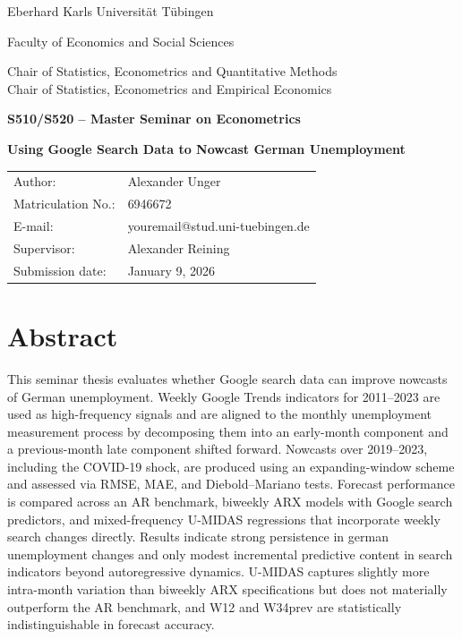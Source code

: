 \documentclass[12pt,a4paper]{article}
\makeatletter
\newcommand{\university}{Eberhard Karls Universität Tübingen}
\newcommand{\faculty}{Faculty of Economics and Social Sciences}
\newcommand{\seminar}{S510/S520 – Master Seminar on Econometrics}
\newcommand{\chairA}{Chair of Statistics, Econometrics and Quantitative Methods}
\newcommand{\chairB}{Chair of Statistics, Econometrics and Empirical Economics}
\newcommand{\supervisor}{Alexander Reining}
\newcommand{\authorname}{Alexander Unger}
\newcommand{\matricno}{6946672}
\newcommand{\emailaddr}{youremail@stud.uni-tuebingen.de}
\newcommand{\thesistitle}{Using Google Search Data to Nowcast German Unemployment}
\newcommand{\submissiondate}{January 9, 2026}
\makeatother
\begin{document}
\begin{titlepage}
  \centering
  {\large \university \par}
  \vspace{2mm}
  {\large \faculty \par}
  \vspace{18mm}
  {\large \chairA\\[2mm]\chairB\par}
  \vspace{18mm}
  {\Large \textbf{\seminar}\par}
  \vspace{18mm}
  {\LARGE \textbf{\thesistitle}\par}
  \vspace{18mm}
  \begin{tabular}{ll}
    Author:      & \authorname \\
    Matriculation No.: & \matricno \\
    E-mail:      & \emailaddr \\
    Supervisor:  & \supervisor \\
    Submission date: & \submissiondate \\
  \end{tabular}
  \vfill
\end{titlepage}



\section*{Abstract}
This seminar thesis evaluates whether Google search data can improve nowcasts of German unemployment. Weekly Google Trends indicators for 2011–2023 are used as high-frequency signals and are aligned to the monthly unemployment measurement process by decomposing them into an early-month component and a previous-month late component shifted forward. 
Nowcasts over 2019–2023, including the COVID-19 shock, are produced using an expanding-window scheme and assessed via RMSE, MAE, and Diebold–Mariano tests. Forecast performance is compared across an AR benchmark, biweekly ARX models with Google search predictors, and mixed-frequency U-MIDAS regressions that incorporate weekly search changes directly. Results indicate strong persistence in german unemployment changes and only modest incremental predictive content in search indicators beyond autoregressive dynamics. U-MIDAS captures slightly more intra-month variation than biweekly ARX specifications but does not materially outperform the AR benchmark, and W12 and W34prev are statistically indistinguishable in forecast accuracy.
\newpage
\tableofcontents
\newpage
\listoffigures %
\newpage
\listoftables  %
\newpage
{}
\end{document}
